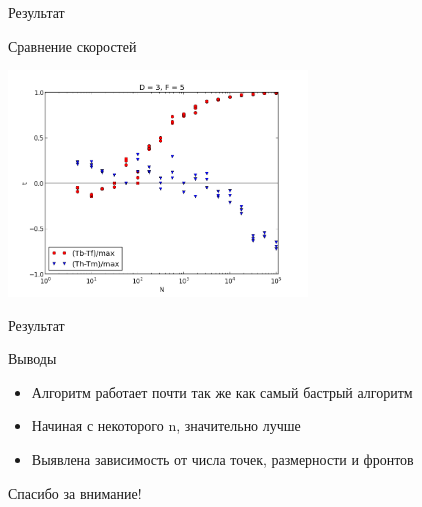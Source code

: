 \documentclass{beamer}
\begin{document}
\begin{frame}{Результат}
\begin{block}{Сравнение скоростей}
\begin{center}
\includegraphics*[height=6cm]{pic/result.png}
\end{center}
\end{block}
\end{frame}


\begin{frame}{Результат}
\begin{block}{Выводы}
\begin{itemize}
\item {Алгоритм работает почти так же как самый бастрый алгоритм}
\item {Начиная с некоторого n, значительно лучше}
\item {Выявлена зависимость от числа точек, размерности и фронтов}
\end{itemize}
\end{block}
\end{frame}

\begin{frame}{}
\begin{center}
Спасибо за внимание!
\end{center}
\end{frame}

\appendix

%
\end{document}

